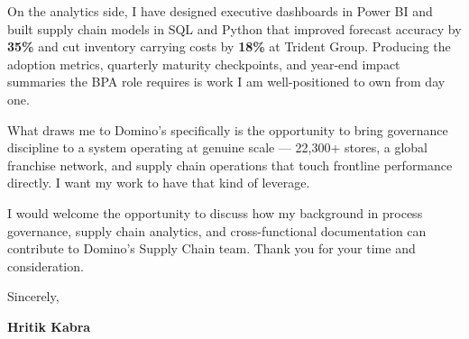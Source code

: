 \documentclass[letterpaper,10pt]{article}
\begin{document}
On the analytics side, I have designed executive dashboards in Power BI and built supply chain models in SQL and Python that improved forecast accuracy by \textbf{35\%} and cut inventory carrying costs by \textbf{18\%} at Trident Group. Producing the adoption metrics, quarterly maturity checkpoints, and year-end impact summaries the BPA role requires is work I am well-positioned to own from day one.

What draws me to Domino's specifically is the opportunity to bring governance discipline to a system operating at genuine scale — \mbox{22,300+} stores, a global franchise network, and supply chain operations that touch frontline performance directly. I want my work to have that kind of leverage.

I would welcome the opportunity to discuss how my background in process governance, supply chain analytics, and cross-functional documentation can contribute to Domino's Supply Chain team. Thank you for your time and consideration.

\vspace{14pt}

Sincerely,

\vspace{18pt}

\textbf{\color{heading} Hritik Kabra}
\end{document}
